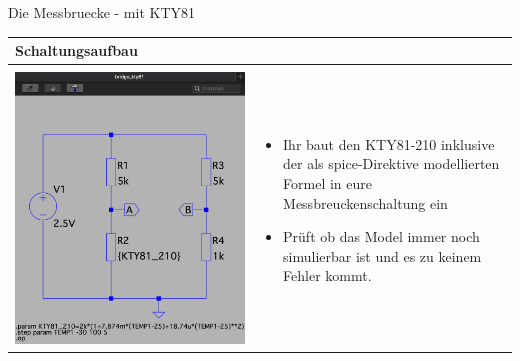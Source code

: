 \begin{frame}[t]{Die Messbruecke - mit KTY81} 
    
    \begin{spacing}{0.9} \begin{tiny}
      \begin{table}[h!]
      \begin{tabular}{p{5cm} p{5cm} }
        \hline
        \textbf{Schaltungsaufbau} \\
        \hline \\
        \begin{minipage}{0.5\textwidth}
            \includegraphics[width=0.9\linewidth]{pictures/mb_kty81.png}
        \end{minipage} 
        &
        \begin{minipage}{0.5\textwidth}
            \begin{itemize}
                \item Ihr baut den KTY81-210 inklusive der als spice-Direktive modellierten Formel in eure Messbreuckenschaltung ein
                \item Prüft ob das Model immer noch simulierbar ist und es zu keinem Fehler kommt. 
            \end{itemize}
        \end{minipage} 
        \\
        
    \end{tabular}

    \end{table}
     
    \end{tiny} \end{spacing}

\end{frame}

